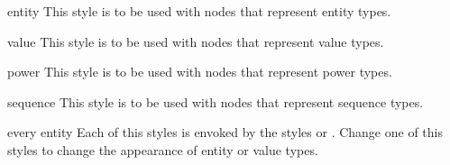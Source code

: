 \documentclass[a4paper,10pt]{article}
\begin{document}
\begin{stylekey}{entity}
This style is to be used with nodes that represent entity types.
\begin{codeexample}[]
\end{codeexample}
\end{stylekey}

\begin{stylekey}{value}
This style is to be used with nodes that represent value types.
\begin{codeexample}[]
\end{codeexample}
\end{stylekey}

\begin{stylekey}{power}
This style is to be used with nodes that represent power types.
\begin{codeexample}[]
\end{codeexample}
\end{stylekey}

\begin{stylekey}{sequence}
This style is to be used with nodes that represent sequence types.
\begin{codeexample}[]
\end{codeexample}
\end{stylekey}

\begin{stylekey}{every entity}
Each of this styles is envoked by the styles  or . Change one of this styles to change the appearance of entity or value types.
\begin{codeexample}[width=3cm]
\end{codeexample}
\end{stylekey}
\end{document}
